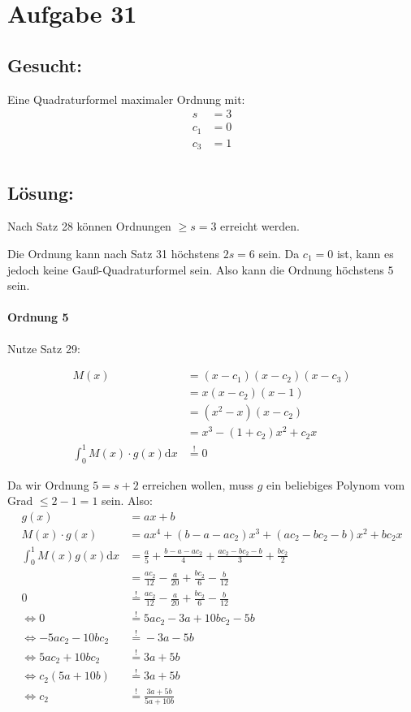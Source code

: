\section*{Aufgabe 31}
\subsection*{Gesucht:}
Eine Quadraturformel maximaler Ordnung mit:
\begin{align}
    s   &= 3\\
    c_1 &= 0\\
    c_3 &= 1\\
\end{align}

\subsection*{Lösung:}

Nach Satz 28 können Ordnungen $\geq s = 3$ erreicht werden.

Die Ordnung kann nach Satz 31 höchstens $2s = 6$ sein. Da $c_1 = 0$
ist, kann es jedoch keine Gauß-Quadraturformel sein. Also kann
die Ordnung höchstens $5$ sein.

\paragraph*{Ordnung 5}

Nutze Satz 29:

\begin{align}
    M(x) &= (x-c_1) (x-c_2) (x-c_3)\\
      &= x (x-c_2) (x-1)\\
      &= (x^2- x) (x-c_2)\\
      &= x^3 - (1+c_2)x^2 + c_2 x\\
    \int_0^1 M(x) \cdot g(x) \mathrm{d} x &\stackrel{!}{=} 0
\end{align}

Da wir Ordnung $5 = s + 2$ erreichen wollen, muss $g$ ein beliebiges
Polynom vom Grad $\leq 2-1 = 1$ sein. Also:
\begin{align}
    g(x) &= ax + b\\
    M(x) \cdot g(x) &= ax^4 + (b-a-ac_2)x^3 + (ac_2-bc_2-b)x^2 + b c_2 x\\
    \int_0^1 M(x) g(x) \mathrm{d} x &= \frac{a}{5} + \frac{b-a-ac_2}{4} + \frac{ac_2 - bc_2-b}{3} + \frac{b c_2}{2}\\
    &= \frac{a c_2}{12}-\frac{a}{20}+\frac{b c_2}{6}-\frac{b}{12}\\
    0 &\stackrel{!}{=}\frac{a c_2}{12}-\frac{a}{20}+\frac{b c_2}{6}-\frac{b}{12}\\
    \Leftrightarrow 0 &\stackrel{!}{=} 5 a c_2 - 3a + 10 b c_2 - 5 b\\
    \Leftrightarrow -5 a c_2 - 10 b c_2&\stackrel{!}{=}  - 3a - 5 b\\
    \Leftrightarrow 5 a c_2 + 10 b c_2&\stackrel{!}{=}  3a + 5 b\\
    \Leftrightarrow c_2(5 a + 10 b)&\stackrel{!}{=}  3a + 5 b\\
    \Leftrightarrow c_2 &\stackrel{!}{=}  \frac{3a + 5 b}{5 a + 10 b}
\end{align}

